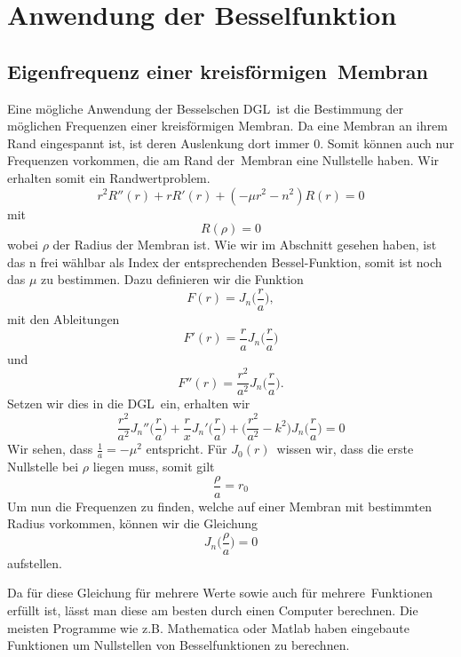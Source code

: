\section{Anwendung der Besselfunktion}
\subsection[Eigenfrequenz einer kreisförmigen Membram]{Eigenfrequenz einer kreisförmigen Membran}

Eine mögliche Anwendung der Besselschen DGL ist die Bestimmung der möglichen Frequenzen einer kreisförmigen Membran. 
Da eine Membran an ihrem Rand eingespannt ist, ist deren Auslenkung dort immer 0. Somit können auch nur Frequenzen vorkommen, die am Rand der Membran eine Nullstelle haben. Wir erhalten somit ein Randwertproblem.
\begin{equation}
r^2 R''(r) + r R'(r) + (-\mu r^2 - n^2)R(r) = 0
\end{equation}
mit 
\begin{equation}
R(\rho) = 0
\end{equation}
wobei $\rho$ der Radius der Membran ist.
Wie wir im Abschnitt  gesehen haben, ist das n frei wählbar als Index der entsprechenden Bessel-Funktion, somit ist noch das $\mu$ zu bestimmen. 
Dazu definieren wir die Funktion
\begin{equation}
F(r) = J_n \biggl(\frac{r}{a} \biggr),
\end{equation}
mit den Ableitungen
\begin{equation}
F'(r) = \frac{r}{a} J_n \biggl(\frac{r}{a} \biggr)
\end{equation}
und 
\begin{equation}
F''(r) = \frac{r^2}{a^2} J_n \biggl(\frac{r}{a} \biggr).
\end{equation}
Setzen wir dies in die DGL ein, erhalten wir
\begin{equation}
\frac{r^2}{a^2}J_n''\biggl(\frac{r}{a} \biggr) + 
\frac{r}{x}J_n'\biggl(\frac{r}{a} \biggr) + 
\biggl(\frac{r^2}{a^2} - k^2\biggr)J_n\biggl(\frac{r}{a}\biggr) = 0
\end{equation}
Wir sehen, dass $\frac{1}{a}=-\mu^2$ entspricht.
Für $J_0(r)$ wissen wir, dass die erste Nullstelle bei $\rho$ liegen muss, somit gilt
\begin{equation}
\frac{\rho}{a} = r_0
\end{equation}
Um nun die Frequenzen zu finden, welche auf einer Membran mit bestimmten Radius vorkommen, können wir die Gleichung
\begin{equation}
J_n\biggl(\frac{\rho}{a}\biggl) = 0
\end{equation}
aufstellen.

Da für diese Gleichung für mehrere Werte sowie auch für mehrere Funktionen erfüllt ist, lässt man diese am besten durch einen Computer berechnen. Die meisten Programme wie z.B. Mathematica oder Matlab haben eingebaute Funktionen um Nullstellen von Besselfunktionen zu berechnen.
